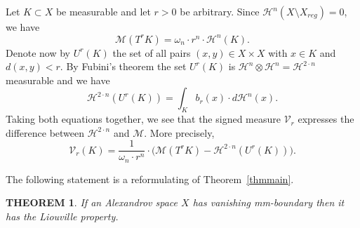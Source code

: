 \documentclass[12pt,leqno,intlimits]{amsart}
\numberwithin{equation}{section}
\newtheorem{thm}{THEOREM}[section]
\theoremstyle{definition}
\theoremstyle{remark}
\newcommand{\tref}[1]{Theorem~\ref{#1}}
\begin{document}
Let $K\subset X$ be measurable and let $r>0$ be arbitrary.
Since $\mathcal H^n (X\setminus X_{reg} )=0$, we have
$$\mathcal M (T^{r} K) =\omega _n \cdot r^n \cdot \mathcal H^n (K).$$
Denote now by $U^r(K)$
the set of all pairs $(x,y)\in X\times X$ with $x\in K$ and $d(x,y)<r$.
By Fubini's theorem the set $U^r(K)$ is $\mathcal H^n \otimes \mathcal H^n =\mathcal H^{2\cdot n}$ measurable and we have
$$\mathcal H^{2\cdot n} (U^r (K))= \int _K b_r (x) \cdot d\mathcal H^n (x). $$
Taking both equations together, we see that the signed measure $\mathcal{V}_r$ expresses the difference between $\mathcal H^{2\cdot n}$ and $\mathcal M$. More precisely,
\begin{equation} \label{eq:compare}
\mathcal{V}_r (K) = \frac 1 {\omega_n \cdot r^n}\cdot \Big(\mathcal M (T^r K)- \mathcal H^{2\cdot n} (U^r (K)) \Big).
\end{equation}

The following statement is a reformulating of \tref{thmmain}.

\begin{thm} \label{reform}
If an Alexandrov space $X$ has vanishing  mm-boundary then it has the Liouville property.
\end{thm}
\end{document}
